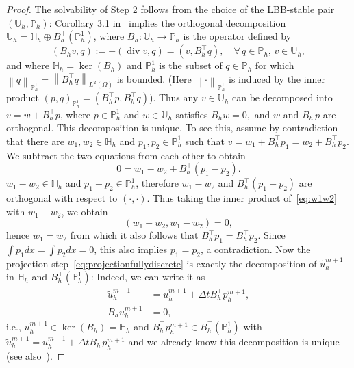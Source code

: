 \documentclass[10pt,letterpaper]{amsart}
\newcommand{\tu}{\widetilde{u}}
\newcommand\norm[1]{\left\lVert#1\right\rVert}
\newcommand{\Div}{\operatorname{div}}
\newcommand{\dom}{\Omega}
\newcommand{\Ph}{\mathbb{P}_h}
\newcommand{\Uh}{\mathbb{U}_h}
\theoremstyle{definition}{\newtheorem{definition}[lemma]{Definition}}
\numberwithin{equation}{section}
\begin{document}
\begin{proof}
	 The solvability of Step 2 follows from the choice of the LBB-stable pair $(\Uh,\Ph)$: Corollary 3.1 in~\cite{Guermond1996} implies the orthogonal decomposition $\Uh = \mathbb{H}_h \oplus B_h^\top (\Ph^1)$, 
	 where $B_h:\Uh\to \Ph$ is the operator defined by 
	 	\begin{equation*}
	 		(B_h v ,q ):=-(\Div v ,q ) = ( v,B_h^\top q ) ,\quad \forall\, q \in \Ph,\, v\in \Uh,
	 		\end{equation*}
	 and
	 where $\mathbb{H}_h = \ker (B_h)$ and $\Ph^1$ is the subset of $q\in \Ph$ for which $\norm{q}_{\Ph^1}=\norm{B_h^\top q}_{L^2(\dom)}$ is bounded. (Here $\norm{\cdot}_{\Ph^1}$ is induced by the inner product $(p,q)_{\Ph^1} = (B_h^\top p,B_h^\top q)$). Thus any $v\in \Uh$ can be decomposed into $v= w + B_h^\top p$, where $p\in \Ph^1$ and $w\in \Uh$ satisfies $B_h w=0,$ and $w$ and $B_h^\top p$ are orthogonal. This decomposition is unique. To see this, assume by contradiction that there are  $w_1,w_2\in \mathbb{H}_h$ and $p_1,p_2\in \Ph^1$ such that $v=w_1 + B_h^\top p_1 = w_2 + B_h^\top p_2$. We subtract the two equations from each other to obtain
	 \begin{equation}\label{eq:w1w2}
	 	0 = w_1 -w_2 + B_h^\top (p_1-p_2).
	 \end{equation}
	 $w_1-w_2\in \mathbb{H}_h$ and $p_1-p_2\in \Ph^1$, therefore $w_1-w_2$ and $B_h^\top(p_1-p_2)$ are orthogonal with respect  to $(\cdot,\cdot)$. Thus taking the inner product of~\eqref{eq:w1w2} with $w_1-w_2$, we obtain
	 \begin{equation*}
	 	(w_1-w_2,w_1-w_2)=0,
	 \end{equation*}
	 hence $w_1=w_2$ from which it also follows that $B_h^\top p_1 = B_h^\top p_2$. Since $\int p_1 dx =\int p_2 dx =0$, this also implies $p_1=p_2$, a contradiction. Now the projection step~\eqref{eq:projectionfullydiscrete} is exactly the decomposition of $\tu^{m+1}_h$ in $\mathbb{H}_h$ and $B_h^\top (\Ph^1)$: Indeed, we can write it as
	  \begin{equation*}
	  	\begin{split}
	  		\tu^{m+1}_h &= u^{m+1}_h +\Delta t B_h^\top p_h^{m+1},\\
	  		B_h u^{m+1}_h & = 0,
	  	\end{split}
	  \end{equation*}
	  i.e., $u^{m+1}_h\in \ker(B_h)=\mathbb{H}_h$ and $B_h^\top p_h^{m+1}\in B_h^{\top }(\Ph^1)$ with $\tu^{m+1}_h = u^{m+1}_h +\Delta t B_h^\top p_h^{m+1}$ and we already know this decomposition is unique (see also~\cite{Guermond1998}).
\end{proof}
\end{document}
